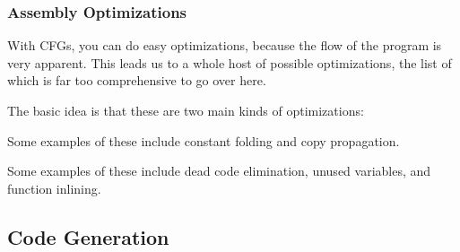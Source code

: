 \documentclass[aspectratio=169, handout]{beamer}
\begin{document}
\begin{frame}[fragile]
  \frametitle{Assembly Optimizations}

  With CFGs, you can do easy optimizations, because the flow of the program
  is very apparent. This leads us to a whole host of possible optimizations,
  the list of which is far too comprehensive to go over here.

  \pause
  \vspace{\fill}

  The basic idea is that these are two main kinds of optimizations:

  \pause
  \vspace{\fill}


  Some examples of these include constant folding and copy propagation.

  \pause
  \vspace{\fill}


  Some examples of these include dead code elimination, unused variables,
  and function inlining.
\end{frame}

\subsection{\color{presentColor}Code Generation}
\end{document}
